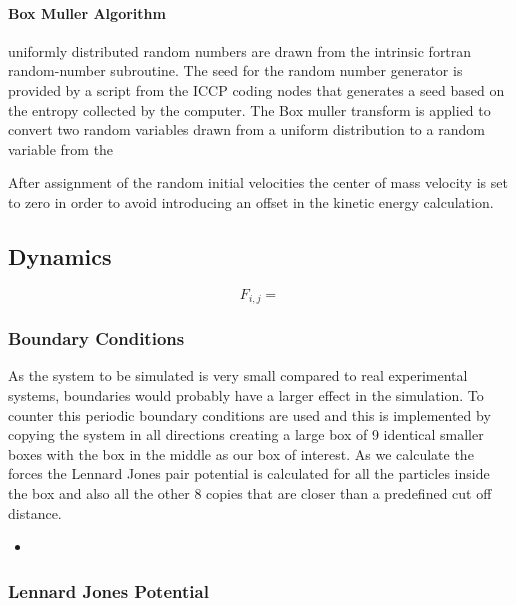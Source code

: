\documentclass[
10pt, %
a4paper, %
oneside, %
headinclude,footinclude, %
BCOR5mm, %
]{scrartcl}
\newcommand{\insertcode}[2]{\begin{itemize}\item[]\end{itemize}} %
\begin{document}
\paragraph{Box Muller Algorithm}
uniformly distributed random numbers are drawn from the intrinsic fortran random-number subroutine. The seed for the random number generator is provided by a script \cite{} from the ICCP coding nodes that generates a seed based on the entropy collected by the computer. The Box muller transform \cite{} is applied to convert two random variables drawn from a uniform distribution to a random variable from the 

After assignment of the random initial velocities the center of mass velocity is set to zero in order to avoid introducing an offset in the kinetic energy calculation.

\subsection{Dynamics}

\begin{equation}
F_{i,j} = 
\end{equation}

\subsubsection{Boundary Conditions}
As the system to be simulated is very small compared to real experimental systems, boundaries would probably have a larger effect in the simulation. To counter this periodic boundary conditions are used and this is implemented by copying the system in all directions creating a large box of 9 identical smaller boxes with the box in the middle as our box of interest. As we calculate the forces the Lennard Jones pair potential is calculated for all the particles inside the box and also all the other 8 copies that are closer than a predefined cut off distance. 

\insertcode{"Scripts/boundary_conditions_snippet_1.f90"}{Creating periodic boundary conditions} %





\subsubsection{Lennard Jones Potential}
\end{document}
